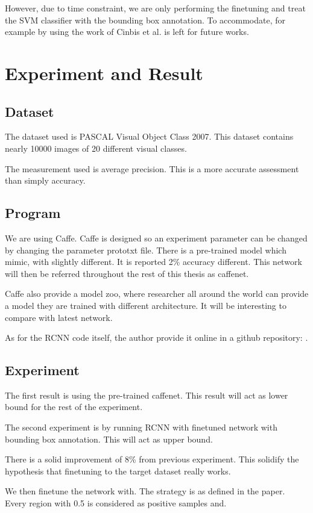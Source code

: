\documentclass[a4paper,11pt]{kth-mag}
\begin{document}
However, due to time constraint, we are only performing the finetuning and treat the SVM classifier with the bounding box annotation. To accommodate, for example by using the work of Cinbis et al. \cite{cinbis} is left for future works.

\chapter{Experiment and Result}
\section{Dataset}
The dataset used is PASCAL Visual Object Class 2007. This dataset contains nearly 10000 images of 20 different visual classes.

The measurement used is average precision. This is a more accurate assessment than simply accuracy.

\section{Program}
We are using Caffe.
Caffe is designed so an experiment parameter can be changed by changing the parameter prototxt file.
There is a pre-trained model which mimic, with slightly different. It is reported 2\% accuracy different. This network will then be referred throughout the rest of this thesis as caffenet.

Caffe also provide a model zoo, where researcher all around the world can provide a model they are trained with different architecture. It will be interesting to compare with latest network.

As for the RCNN code itself, the author provide it online in a github repository: .

\section{Experiment}

The first result is using the pre-trained caffenet. This result will act as lower bound for the rest of the experiment.

The second experiment is by running RCNN with finetuned network with bounding box annotation. This will act as upper bound.

There is a solid improvement of 8\% from previous experiment. This solidify the hypothesis that finetuning to the target dataset really works.

We then finetune the network with. The strategy is as defined in the paper. Every region with 0.5 is considered as positive samples and.
\end{document}
